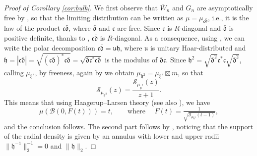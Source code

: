 \documentclass[11pt,oneside]{amsart}
\theoremstyle{plain}
\numberwithin{equation}{section}
\begin{document}
\begin{proof}[Proof of Corollary \ref{cor:bulk}]
We first observe that $\bar{W}_n$ and $G_n$ are asymptotically free by \cite[Theorem 4.3]{HP}, so that the limiting distribution can be written as
$\mu = \mu_{\mathfrak{c}\bar{\mathfrak{d}}}$, i.e., it is the law of the product $\mathfrak{c}\bar{\mathfrak{d}}$, where $\bar{\mathfrak{d}}$ and $\mathfrak{c}$ are free. Since $\mathfrak{c}$ is $R$-diagonal and $\bar{\mathfrak{d}}$ is positive definite,  thanks to \cite[Theorem 9.7]{speicher2025lecturenotesfreeprobability},  $\mathfrak{c}\bar{\mathfrak{d}}$ is $R$-diagonal. As a consequence, using \cite[Theorem 9.8]{speicher2025lecturenotesfreeprobability}, we can write the polar decomposition $\mathfrak{c}\bar{\mathfrak{d}}=\mathfrak{u} \mathfrak{h}$, where $\mathfrak{u}$ is unitary Haar-distributed and $\mathfrak{h}=|\mathfrak{c}\bar{\mathfrak{d}}|=\sqrt{(\mathfrak{c}\bar{\mathfrak{d}})^*\mathfrak{c}\bar{\mathfrak{d}}}=\sqrt{\bar{\mathfrak{d}}\mathfrak{c}^*\mathfrak{c}\bar{\mathfrak{d}}}$ is the modulus of $\bar{\mathfrak{d}}\mathfrak{c}$. Since $\mathfrak{h}^2=\sqrt{\bar{\mathfrak{d}}^2}\mathfrak{c}^*\mathfrak{c}\sqrt{\bar{\mathfrak{d}}^2}$, calling $\mu_{{\bar{\mathfrak{d}}}^2}$, by freeness, again by \cite[Theorem 4.3]{HP} we obtain
    $\mu_{\mathfrak{h}^2}=\mu_{{\bar{\mathfrak{d}}}^2} \boxtimes m$,
so that 
\begin{equation}
    \mathcal{S}_{\mu_{\mathfrak{h}^2}}(z) = \frac{\mathcal{S}_{\mu_{{\bar{\mathfrak{d}}}^2}}(z)}{z+1}.
\end{equation}
This means that using Haagerup--Larsen theory
\cite[Theorem 4.4]{HL} (see also \cite[Sect 11.6, Theorem 8]{mingo}), we have
  \begin{equation}
        \mu\left(\mathcal{B}(0,F(t))\right) = t, \qquad \text{where }\quad  F(t)=\tfrac{1}{\sqrt{\mathcal{S}_{\mu_{\mathfrak{h}^2}}(t-1)}},
    \end{equation}
and the conclusion follows. The second part follows by \cite[Corollary 4.5]{HL}, noticing that the support of the radial density is given by an annulus with lower and upper radii $\|\mathfrak{h}^{-1}\|_2^{-1}=0$ and $\|\mathfrak{h}\|_2$.
\end{proof}
\end{document}
